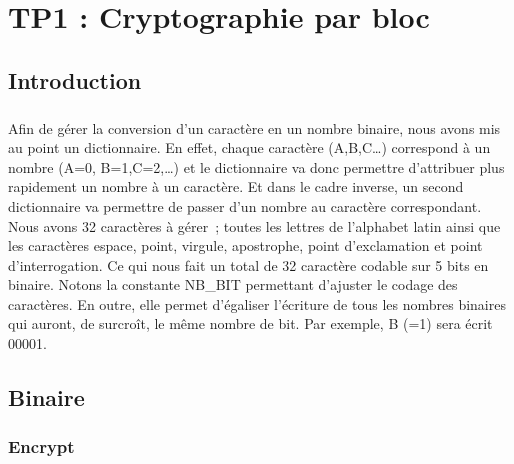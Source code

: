 \documentclass[11pt,fleqn]{book} %
\begin{document}
\chapter{TP1 : Cryptographie par bloc}



\section{Introduction}

\paragraph{}Afin de gérer la conversion d'un caractère en un nombre binaire, nous avons mis au point un dictionnaire. En effet, chaque caractère (A,B,C…) correspond à un nombre (A=0, B=1,C=2,…) et le dictionnaire va donc permettre d'attribuer plus rapidement un nombre à un caractère. Et dans le cadre inverse, un second dictionnaire va permettre de passer d'un nombre au caractère correspondant.
\vspace{0.5cm} Nous avons 32 caractères à gérer ; toutes les lettres de l'alphabet latin ainsi que les caractères espace, point, virgule, apostrophe, point d'exclamation et point d'interrogation. Ce qui nous fait un total de 32 caractère codable sur 5 bits en binaire. Notons la constante NB\_BIT permettant d'ajuster le codage des caractères. En outre, elle permet d’égaliser l'écriture de tous les nombres binaires qui auront, de surcroît, le même nombre de bit. Par exemple, B (=1) sera écrit 00001.

\section{Binaire}

\subsection{Encrypt}
\end{document}
